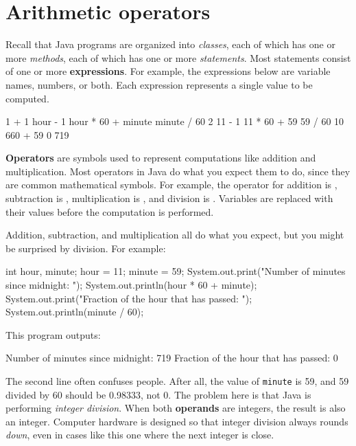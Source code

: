 \section{Arithmetic operators}


Recall that Java programs are organized into {\em classes}, each of which has one or more {\em methods}, each of which has one or more {\em statements}.
Most statements consist of one or more {\bf expressions}.
For example, the expressions below are variable names, numbers, or both.
Each expression represents a single value to be computed.

\begin{code}
    1 + 1     hour - 1     hour * 60 + minute     minute / 60
    2         11 - 1       11 * 60 + 59           59 / 60
              10           660 + 59               0
                           719
\end{code}


{\bf Operators} are symbols used to represent computations like addition and multiplication.
Most operators in Java do what you expect them to do, since they are common mathematical symbols.
For example, the operator for addition is \java{+}, subtraction is \java{-}, multiplication is \java{*}, and division is \java{/}.
Variables are replaced with their values before the computation is performed.

Addition, subtraction, and multiplication all do what you expect, but you might be surprised by division.
For example:

\begin{code}
    int hour, minute;
    hour = 11;
    minute = 59;
    System.out.print("Number of minutes since midnight: ");
    System.out.println(hour * 60 + minute);
    System.out.print("Fraction of the hour that has passed: ");
    System.out.println(minute / 60);
\end{code}

This program outputs:

\begin{stdout}
Number of minutes since midnight: 719
Fraction of the hour that has passed: 0
\end{stdout}


The second line often confuses people.
After all, the value of {\tt minute} is 59, and 59 divided by 60 should be 0.98333, not 0.
The problem here is that Java is performing {\em integer division}.
When both {\bf operands} are integers, the result is also an integer.
Computer hardware is designed so that integer division always rounds {\em down}, even in cases like this one where the next integer is close.

